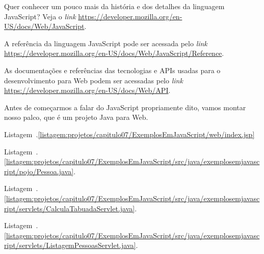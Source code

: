 \begin{saibaMais}
    Quer conhecer um pouco mais da história e dos detalhes da linguagem JavaScript? Veja o \textit{link} \url{https://developer.mozilla.org/en-US/docs/Web/JavaScript}.
\end{saibaMais}

\begin{saibaMais}
    A referência da linguagem JavaScript pode ser acessada pelo \textit{link} \url{https://developer.mozilla.org/en-US/docs/Web/JavaScript/Reference}.
\end{saibaMais}

\begin{saibaMais}
    As documentações e referências das tecnologias e APIs usadas para o desenvolvimento para Web podem ser acessadas pelo \textit{link} \url{https://developer.mozilla.org/en-US/docs/Web/API}.
\end{saibaMais}

Antes de começarmos a falar do JavaScript propriamente dito, vamos montar nosso palco, que é um projeto Java para Web.

Listagem~\thechapter.\ref{listagem:projetos/capitulo07/ExemplosEmJavaScript/web/index.jsp}



Listagem~\thechapter.\ref{listagem:projetos/capitulo07/ExemplosEmJavaScript/src/java/exemplosemjavascript/pojo/Pessoa.java}.



Listagem~\thechapter.\ref{listagem:projetos/capitulo07/ExemplosEmJavaScript/src/java/exemplosemjavascript/servlets/CalculaTabuadaServlet.java}.



Listagem~\thechapter.\ref{listagem:projetos/capitulo07/ExemplosEmJavaScript/src/java/exemplosemjavascript/servlets/ListagemPessoasServlet.java}.



